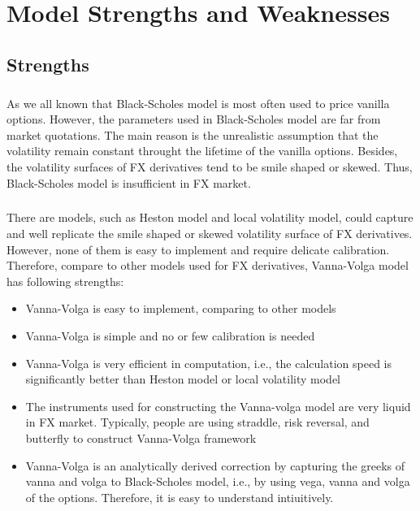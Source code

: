 \chapter{Model Strengths and Weaknesses}


\section{Strengths}

\paragraph{}

As we all known that Black-Scholes model is most often used to price vanilla options. However, the parameters used in Black-Scholes model are far from market quotations. The main reason is the unrealistic assumption that the volatility remain constant throught the lifetime of the vanilla options. Besides, the volatility surfaces of FX derivatives tend to be smile shaped or skewed. Thus, Black-Scholes model is insufficient in FX market.
	
\paragraph{}

There are models, such as Heston model and local volatility model, could capture and well replicate the smile shaped or skewed volatility surface of FX derivatives. However, none of them is easy to implement and require delicate calibration. Therefore, compare to other models used for FX derivatives, Vanna-Volga model has following strengths:

\begin{itemize}
	\item Vanna-Volga is easy to implement, comparing to other models
	\item Vanna-Volga is simple and no or few calibration is needed
	\item Vanna-Volga is very efficient in computation, i.e., the calculation speed is significantly better than Heston model or local volatility model
	\item The instruments used for constructing the Vanna-volga model are very liquid in FX market. Typically, people are using straddle, risk reversal, and butterfly to construct Vanna-Volga framework
	\item Vanna-Volga is an analytically derived correction by capturing the greeks of vanna and volga to Black-Scholes model, i.e., by using vega, vanna and volga of the options. Therefore, it is easy to understand intiuitively.
\end{itemize}


